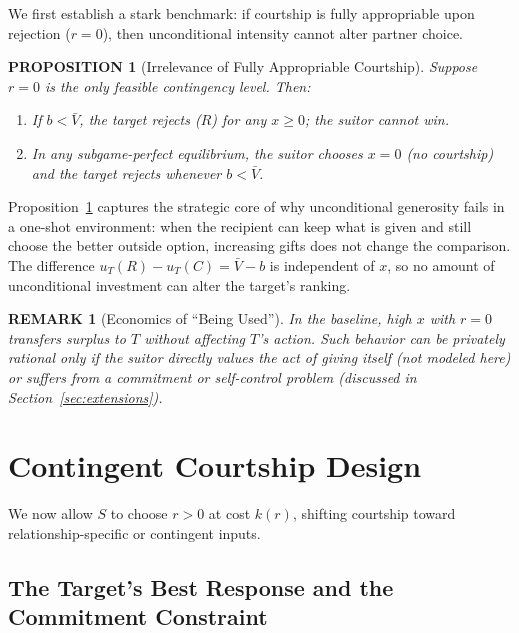 \documentclass[AER]{AEA}
\newtheorem{proposition}{PROPOSITION}
\newtheorem{remark}{REMARK}
\begin{document}
We first establish a stark benchmark: if courtship is fully appropriable upon rejection ($r=0$), then unconditional intensity cannot alter partner choice.

\begin{proposition}[Irrelevance of Fully Appropriable Courtship]\label{prop:irrelevance}
Suppose $r=0$ is the only feasible contingency level.
Then:
\begin{enumerate}[leftmargin=0.75in]
\item If $b < \bar{V}$, the target rejects ($R$) for any $x \ge 0$; the suitor cannot win.
\item In any subgame-perfect equilibrium, the suitor chooses $x=0$ (no courtship) and the target rejects whenever $b<\bar{V}$.
\end{enumerate}
\end{proposition}

Proposition~\ref{prop:irrelevance} captures the strategic core of why unconditional generosity fails in a one-shot environment:
when the recipient can keep what is given and still choose the better outside option, increasing gifts does not change the comparison.
The difference $u_T(R) - u_T(C) = \bar{V} - b$ is independent of $x$, so no amount of unconditional investment can alter the target's ranking.

\begin{remark}[Economics of ``Being Used'']
In the baseline, high $x$ with $r=0$ transfers surplus to $T$ without affecting $T$'s action.
Such behavior can be privately rational only if the suitor directly values the act of giving itself (not modeled here) or suffers from a commitment or self-control problem (discussed in Section~\ref{sec:extensions}).
\end{remark}

\section{Contingent Courtship Design}

We now allow $S$ to choose $r>0$ at cost $k(r)$, shifting courtship toward relationship-specific or contingent inputs.

\subsection{The Target's Best Response and the Commitment Constraint}
\end{document}
